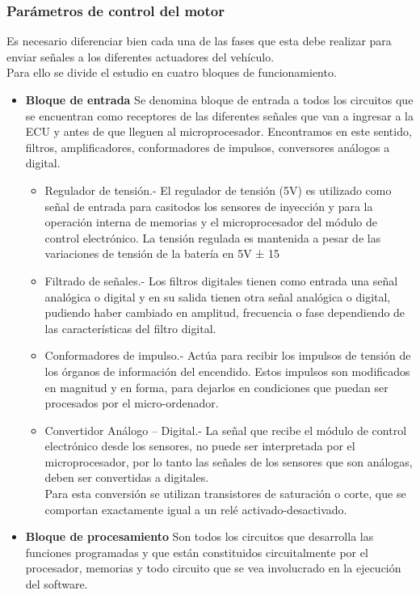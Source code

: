 \subsubsection{Parámetros de control del motor} %
Es necesario diferenciar bien cada una de las fases que esta debe realizar para enviar señales a los diferentes actuadores del vehículo.\\
Para ello se divide el estudio en cuatro bloques de funcionamiento. 
\begin{itemize}
    \item \textbf{Bloque de entrada} Se denomina bloque de entrada a todos los circuitos que se encuentran como receptores de las diferentes señales que van a ingresar a la ECU y antes de que lleguen al microprocesador. Encontramos en este sentido, filtros, amplificadores, conformadores de impulsos, conversores análogos a digital. 
    \begin{itemize}
        \item Regulador de tensión.- El regulador de tensión (5V) es utilizado como señal de entrada para casitodos los sensores de inyección y para la operación interna de memorias y el microprocesador del módulo de control electrónico.
        La tensión regulada es mantenida a pesar de las variaciones de tensión de la batería en 5V ± 15%
        \item Filtrado de señales.-  Los filtros digitales tienen como entrada una señal analógica o digital y en su salida tienen otra señal analógica o digital, pudiendo haber cambiado en amplitud, frecuencia o fase dependiendo de las características del filtro digital. 
        \item Conformadores de impulso.- Actúa para recibir los impulsos de tensión de los órganos de información del encendido. Estos impulsos son modificados en magnitud y en forma, para dejarlos en condiciones que puedan ser procesados por el micro-ordenador. 
        \item Convertidor Análogo – Digital.- La señal que recibe el módulo de control electrónico desde los sensores, no puede ser interpretada por el microprocesador, por lo tanto las señales de los sensores que son análogas, deben ser convertidas a digitales.\\
        Para esta conversión se utilizan transistores de saturación o corte, que se comportan exactamente igual a un relé activado-desactivado. 
    \end{itemize}
    \item \textbf{Bloque de procesamiento} Son todos los circuitos que desarrolla las funciones programadas y que están constituidos circuitalmente por el procesador, memorias y todo circuito que se vea involucrado en la ejecución del software. 

\end{itemize}
